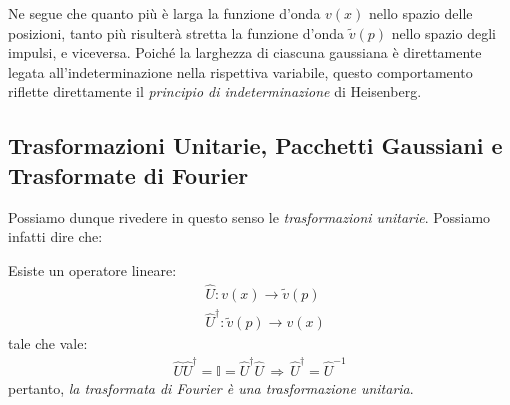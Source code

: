 \begin{minipage}{0.5\textwidth}


\end{minipage}
\hfill
\begin{minipage}{0.5\textwidth}


\end{minipage}

\vspace{1em}

	Ne segue che quanto più è larga la funzione d'onda $v(x)$ nello spazio delle posizioni, tanto più risulterà stretta la funzione d'onda $\tilde{v}(p)$ nello spazio degli impulsi, e viceversa. Poiché la larghezza di ciascuna gaussiana è direttamente legata all'indeterminazione nella rispettiva variabile, questo comportamento riflette direttamente il \textit{principio di indeterminazione} di Heisenberg.
	
\subsection{Trasformazioni Unitarie, Pacchetti Gaussiani e Trasformate di Fourier}
	
	Possiamo dunque rivedere in questo senso le \textit{trasformazioni unitarie}. Possiamo infatti dire che:
	
\begin{nb}
	Esiste un operatore lineare:
\begin{align*}
	&\hat{U} : v(x) \to \tilde{v}(p) \\
	&\hat{U}^{\dagger} : \tilde{v}(p) \to v(x)
\end{align*}
	tale che vale:
\begin{align*}
	\hat{U}\hat{U}^{\dagger} = \mathbb{I} = \hat{U}^{\dagger}\hat{U} \, \Rightarrow \, \hat{U}^{\dagger} = \hat{U}^{-1}
\end{align*}
	pertanto, \textit{la trasformata di Fourier è una trasformazione unitaria}.
\end{nb}

